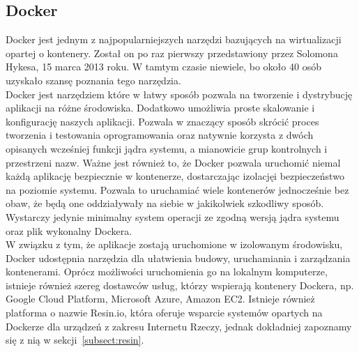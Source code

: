 \documentclass[12pt]{report}
\let\Oldsubsection\subsection
\renewcommand{\subsection}{\FloatBarrier\Oldsubsection}
\begin{document}
\subsection{Docker}
Docker jest jednym z najpopularniejszych narzędzi bazujących na wirtualizacji opartej o kontenery. Został on po raz pierwszy przedstawiony przez Solomona Hykesa, 15 marca 2013 roku. W tamtym czasie niewiele, bo około 40 osób uzyskało szansę poznania tego narzędzia. \\
\indent Docker jest narzędziem które w łatwy sposób pozwala na tworzenie i dystrybucję aplikacji na różne środowiska. Dodatkowo umożliwia proste skalowanie i konfigurację naszych aplikacji. Pozwala w znaczący sposób skrócić proces tworzenia i testowania oprogramowania oraz natywnie korzysta z dwóch opisanych wcześniej funkcji jądra systemu, a mianowicie grup kontrolnych i przestrzeni nazw. Ważne jest również to, że Docker pozwala uruchomić niemal każdą aplikację bezpiecznie w kontenerze, dostarczając izolacjęi bezpieczeństwo na poziomie systemu. Pozwala to uruchamiać wiele kontenerów jednocześnie bez obaw, że będą one oddziaływały na siebie w jakikolwiek szkodliwy sposób. Wystarczy jedynie minimalny system operacji ze zgodną wersją jądra systemu oraz plik wykonalny Dockera. \\
\indent W związku z tym, że aplikacje zostają uruchomione w izolowanym środowisku, Docker udostępnia narzędzia dla ułatwienia budowy, uruchamiania i zarządzania kontenerami. Oprócz możliwości uruchomienia go na lokalnym komputerze, istnieje również szereg dostawców usług, którzy wspierają kontenery Dockera, np. Google Cloud Platform, Microsoft Azure, Amazon EC2. Istnieje również platforma o nazwie Resin.io, która oferuje wsparcie systemów opartych na Dockerze dla urządzeń z zakresu Internetu Rzeczy, jednak dokładniej zapoznamy się z nią w sekcji~\ref{subsect:resin}.
\end{document}
